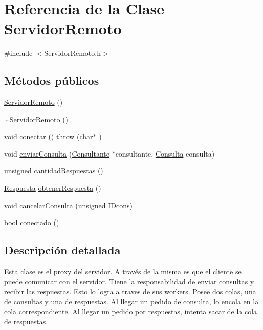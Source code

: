\hypertarget{classServidorRemoto}{\section{\-Referencia de la \-Clase \-Servidor\-Remoto}
\label{classServidorRemoto}
}


{\ttfamily \#include $<$\-Servidor\-Remoto.\-h$>$}

\subsection*{\-Métodos públicos}
\begin{DoxyCompactItemize}
\item 
\hyperlink{classServidorRemoto_a72f8c644faf3490b1f92a46b6511d9a7}{\-Servidor\-Remoto} ()
\item 
\hyperlink{classServidorRemoto_a1463614bdc7306b059312d24d6b8ad6e}{$\sim$\-Servidor\-Remoto} ()
\item 
void \hyperlink{classServidorRemoto_ada46e4be2c67a36dc407e8b56d55d25a}{conectar} ()  throw (char$\ast$ )
\item 
void \hyperlink{classServidorRemoto_a88916beeb79e2c6fae55855421dc4e12}{enviar\-Consulta} (\hyperlink{classConsultante}{\-Consultante} $\ast$consultante, \hyperlink{classConsulta}{\-Consulta} consulta)
\item 
unsigned \hyperlink{classServidorRemoto_ab94de4bf6596f587cd2ecc322505c170}{cantidad\-Respuestas} ()
\item 
\hyperlink{classRespuesta}{\-Respuesta} \hyperlink{classServidorRemoto_ad72107564d7d94d961d4520037496918}{obtener\-Respuesta} ()
\item 
void \hyperlink{classServidorRemoto_a80cb4acdf8cdd7138f9cd525bfd9414a}{cancelar\-Consulta} (unsigned \-I\-Dcons)
\item 
bool \hyperlink{classServidorRemoto_a5c362b6e732e03f2f5cf6b2020d3e518}{conectado} ()
\end{DoxyCompactItemize}


\subsection{\-Descripción detallada}
\-Esta clase es el proxy del servidor. \-A través de la misma es que el cliente se puede comunicar con el servidor. \-Tiene la responsabilidad de enviar consultas y recibir las respuestas. \-Esto lo logra a traves de sus workers. \-Posee dos colas, una de consultas y una de respuestas. \-Al llegar un pedido de consulta, lo encola en la cola correspondiente. \-Al llegar un pedido por respuestas, intenta sacar de la cola de respuestas.

